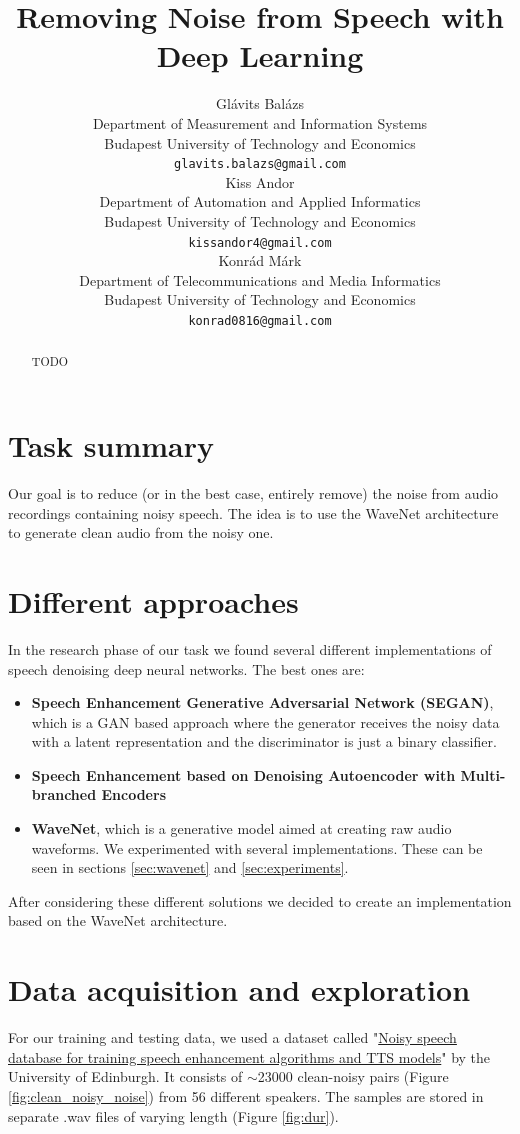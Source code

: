 \documentclass{article}
\title{Removing Noise from Speech with Deep Learning}
\author{
	Glávits Balázs \\
	Department of Measurement and Information Systems\\
	Budapest University of Technology and Economics\\
	\texttt{glavits.balazs@gmail.com} \\
	 \And
	Kiss Andor \\
	Department of Automation and Applied Informatics\\
	Budapest University of Technology and Economics\\
	\texttt{kissandor4@gmail.com} \\	 
	 \And
	Konrád Márk \\
	Department of Telecommunications and Media Informatics\\
	Budapest University of Technology and Economics\\
	\texttt{konrad0816@gmail.com} \\
}
\begin{document}
	
	\maketitle
	
	\begin{abstract}
		TODO
	\end{abstract}
	\newpage
	\section{Task summary}
	\label{sec:summary}
		Our goal is to reduce (or in the best case, entirely remove) the noise from audio recordings containing noisy speech. The idea is to use the WaveNet\cite{wavenet} architecture to generate clean audio from the noisy one.
		
	\section{Different approaches}
	In the research phase of our task we found several different implementations of speech denoising deep neural networks. The best ones are:
	\begin{itemize}
		\item \textbf{Speech Enhancement Generative Adversarial Network (SEGAN)}\cite{pascual2017segan}, which is a GAN based approach where the generator receives the noisy data with a latent representation and the discriminator is just a binary classifier.
		\item \textbf{Speech Enhancement based on Denoising Autoencoder with Multi-branched Encoders
		}\cite{yu2020speech}
		\item \textbf{WaveNet}\cite{wavenet}, which is a generative model aimed at creating raw audio waveforms. We experimented with several implementations. These can be seen in sections \ref{sec:wavenet} and \ref{sec:experiments}.
	\end{itemize}

	After considering these different solutions we decided to create an implementation based on the WaveNet architecture.
		
	\section{Data acquisition and exploration}
	For our training and testing data, we used a dataset called "\href{https://datashare.is.ed.ac.uk/handle/10283/2791}{Noisy speech database for training speech enhancement algorithms and TTS models}"\cite{dataset} by the University of Edinburgh. It consists of $\sim$23000 clean-noisy pairs (Figure \ref{fig:clean_noisy_noise}) from 56 different speakers. 
	The samples are stored in separate .wav files of varying length (Figure \ref{fig:dur}).  
\end{document}
